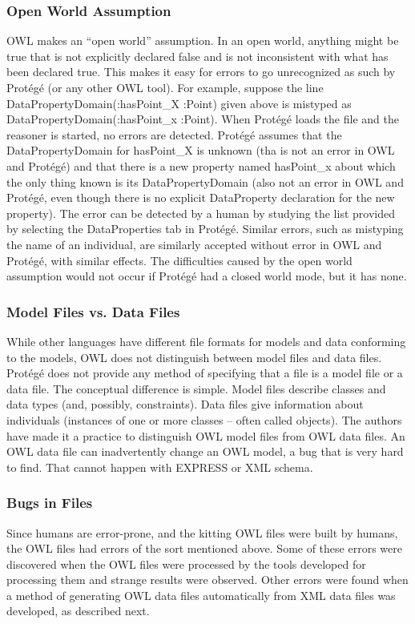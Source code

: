 \subsubsection{Open World Assumption}
OWL makes an ``open world'' assumption.  In an open world, anything might
be true that is not explicitly declared false and is not inconsistent with
what has been declared true. This makes it easy for errors to go
unrecognized as such by  Prot\'{e}g\'{e} (or any other OWL tool). For example,
suppose the line \sf DataPropertyDomain(:hasPoint\_X :Point) \rm given
above is mistyped as \sf DataPropertyDomain(:hasPoint\_x :Point)\rm. When
 Prot\'{e}g\'{e} loads the file and the reasoner is started, no errors are
detected.  Prot\'{e}g\'{e} assumes that the DataPropertyDomain for \sf hasPoint\_X
\rm is unknown (tha is not an error in OWL and  Prot\'{e}g\'{e}) and that there is a new
property named \sf hasPoint\_x \rm about which the only thing known is its
DataPropertyDomain (also not an error in OWL and  Prot\'{e}g\'{e}, even though there is no
explicit DataProperty declaration for the new property). The error can be
detected by a human by studying the list provided by selecting the
DataProperties tab in  Prot\'{e}g\'{e}. Similar errors, such as mistyping the name of an individual, are
similarly accepted without error in OWL and  Prot\'{e}g\'{e}, with similar effects.
The difficulties caused by the open world assumption would not occur if
 Prot\'{e}g\'{e} had a closed world mode, but it has none.\\

\subsubsection{Model Files vs. Data Files}
While other languages have different file formats for models and
data conforming to the models, OWL does not distinguish between model files
and data files.  Prot\'{e}g\'{e} does not provide any method of specifying that a
file is a model file or a data file. The conceptual difference is simple. 
Model files describe classes and data types (and, possibly,
constraints). Data files give information about individuals (instances of
one or more classes -- often called objects). The authors have made it a
practice to distinguish OWL model files from OWL data files. An OWL data
file can inadvertently change an OWL model, a bug that is very hard to
find. That cannot happen with EXPRESS or XML schema.\\

\subsubsection{Bugs in Files}
Since humans are error-prone, and the kitting OWL files were built by
humans, the OWL files had errors of the sort mentioned above. Some of these
errors were discovered when the OWL files were processed by the tools
developed for processing them and strange results were observed. Other
errors were found when a method of generating OWL data files automatically
from XML data files was developed, as described next.

